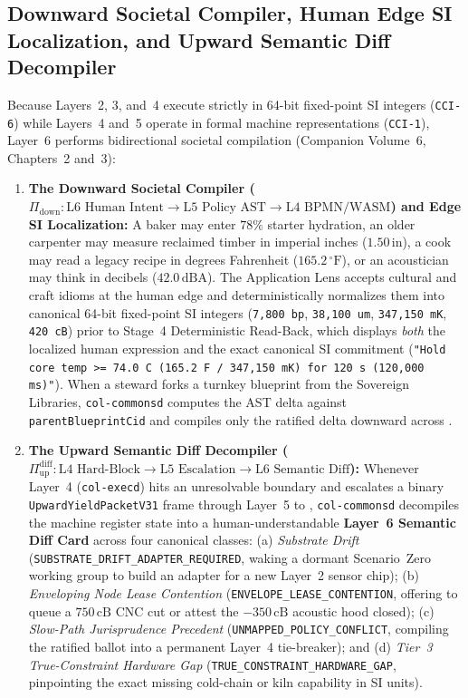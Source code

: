 \subsection{Downward Societal Compiler, Human Edge SI Localization, and Upward Semantic Diff Decompiler}

Because Layers~2, 3, and~4 execute strictly in 64-bit fixed-point SI integers (\texttt{CCI-6}) while Layers~4 and~5 operate in formal machine representations (\texttt{CCI-1}), Layer~6 performs bidirectional societal compilation (Companion Volume~6, Chapters~2 and~3):
\begin{enumerate}
  \item \textbf{The Downward Societal Compiler ($\Pi_{\mathrm{down}} : \text{L6 Human Intent} \to \text{L5 Policy AST} \to \text{L4 BPMN/WASM}$) and Edge SI Localization:} A baker may enter $78\%$ starter hydration, an older carpenter may measure reclaimed timber in imperial inches ($1.50\,\mathrm{in}$), a cook may read a legacy recipe in degrees Fahrenheit ($165.2\,^\circ\mathrm{F}$), or an acoustician may think in decibels ($42.0\,\mathrm{dBA}$). The Application Lens accepts cultural and craft idioms at the human edge and deterministically normalizes them into canonical 64-bit fixed-point SI integers (\texttt{7,800 bp}, \texttt{38,100 um}, \texttt{347,150 mK}, \texttt{420 cB}) prior to Stage~4 Deterministic Read-Back, which displays \textit{both} the localized human expression and the exact canonical SI commitment (\texttt{"Hold core temp >= 74.0 C (165.2 F / 347,150 mK) for 120 s (120,000 ms)"}). When a steward forks a turnkey blueprint from the Sovereign Libraries, \texttt{col-commonsd} computes the AST delta against \texttt{parentBlueprintCid} and compiles only the ratified delta downward across .
  \item \textbf{The Upward Semantic Diff Decompiler ($\Pi_{\mathrm{up}}^{\mathrm{diff}} : \text{L4 Hard-Block} \to \text{L5 Escalation} \to \text{L6 Semantic Diff}$):} Whenever Layer~4 (\texttt{col-execd}) hits an unresolvable boundary and escalates a binary \texttt{UpwardYieldPacketV31} frame through Layer~5 to , \texttt{col-commonsd} decompiles the machine register state into a human-understandable \textbf{Layer~6 Semantic Diff Card} across four canonical classes: (a) \textit{Substrate Drift} (\texttt{SUBSTRATE\_DRIFT\_ADAPTER\_REQUIRED}, waking a dormant Scenario~Zero working group to build an adapter for a new Layer~2 sensor chip); (b) \textit{Enveloping Node Lease Contention} (\texttt{ENVELOPE\_LEASE\_CONTENTION}, offering to queue a $750\,\mathrm{cB}$ CNC cut or attest the $-350\,\mathrm{cB}$ acoustic hood closed); (c) \textit{Slow-Path Jurisprudence Precedent} (\texttt{UNMAPPED\_POLICY\_CONFLICT}, compiling the ratified ballot into a permanent Layer~4 tie-breaker); and (d) \textit{Tier~3 True-Constraint Hardware Gap} (\texttt{TRUE\_CONSTRAINT\_HARDWARE\_GAP}, pinpointing the exact missing cold-chain or kiln capability in SI units).
\end{enumerate}

